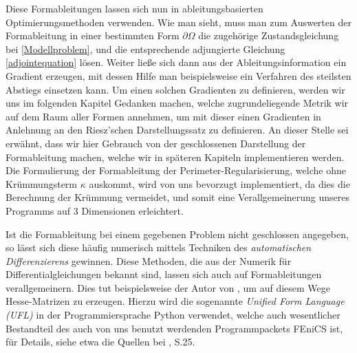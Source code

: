 Diese Formableitungen lassen sich nun in ableitungsbasierten Optimierungsmethoden verwenden. Wie man sieht, muss man zum Auswerten der Formableitung in einer bestimmten Form $\partial\Omega$ die zugehörige Zustandsgleichung bei \ref{Modellproblem}, und die entsprechende adjungierte Gleichung \ref{adjointequation} lösen. Weiter ließe sich dann aus der Ableitungsinformation ein Gradient erzeugen, mit dessen Hilfe man beispielsweise ein Verfahren des steilsten Abstiegs einsetzen kann. Um einen solchen Gradienten zu definieren, werden wir uns im folgenden Kapitel Gedanken machen, welche zugrundeliegende Metrik wir auf dem Raum aller Formen annehmen, um mit dieser einen Gradienten in Anlehnung an den Riesz'schen Darstellungssatz zu definieren. An dieser Stelle sei erwähnt, dass wir hier Gebrauch von der geschlossenen Darstellung der Formableitung machen, welche wir in späteren Kapiteln implementieren werden. Die Formulierung der Formableitung der Perimeter-Regularisierung, welche ohne Krümmungsterm $\kappa$ auskommt, wird von uns bevorzugt implementiert, da dies die Berechnung der Krümmung vermeidet, und somit eine Verallgemeinerung unseres Programms auf 3 Dimensionen erleichtert.

Ist die Formableitung bei einem gegebenen Problem nicht geschlossen angegeben, so lässt sich diese häufig numerisch mittels Techniken des \textit{automatischen Differenzierens} gewinnen. Diese Methoden, die aus der Numerik für Differentialgleichungen bekannt sind, lassen sich auch auf Formableitungen verallgemeinern. Dies tut beispielsweise der Autor von \cite{auto-diff}, um auf diesem Wege Hesse-Matrizen zu erzeugen. Hierzu wird die sogenannte \textit{Unified Form Language (UFL)} in der Programmiersprache Python verwendet, welche auch wesentlicher Bestandteil des auch von uns benutzt werdenden Programmpackets FEniCS ist, für Details, siehe etwa die Quellen bei \cite{fenics}, S.25. 
